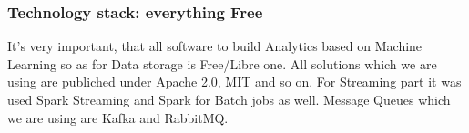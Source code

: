 \documentclass[10pt, a5paper]{article}
\begin{document}
\subsubsection*{Technology stack: everything Free}

It's very important, that all software to build Analytics based on Machine Learning so as for Data storage is Free/Libre one. All solutions which we are using are publiched under Apache 2.0, MIT and so on.
For Streaming part it was used Spark Streaming and Spark for Batch jobs as well. Message Queues which we are using are Kafka and RabbitMQ.
\end{document}
